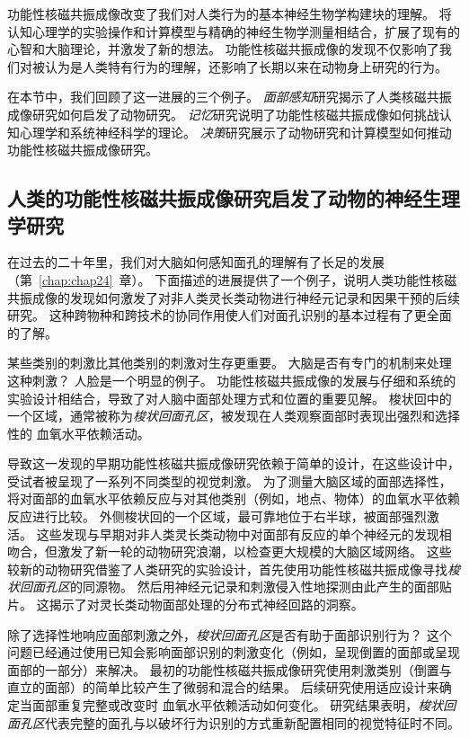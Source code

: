 功能性核磁共振成像改变了我们对人类行为的基本神经生物学构建块的理解。
将认知心理学的实验操作和计算模型与精确的神经生物学测量相结合，扩展了现有的心智和大脑理论，并激发了新的想法。
功能性核磁共振成像的发现不仅影响了我们对被认为是人类特有行为的理解，还影响了长期以来在动物身上研究的行为。


在本节中，我们回顾了这一进展的三个例子。 
\textit{面部感知}研究揭示了人类核磁共振成像研究如何启发了动物研究。
\textit{记忆}研究说明了功能性核磁共振成像如何挑战认知心理学和系统神经科学的理论。
\textit{决策}研究展示了动物研究和计算模型如何推动功能性核磁共振成像研究。


\subsection{人类的功能性核磁共振成像研究启发了动物的神经生理学研究}

在过去的二十年里，我们对大脑如何感知面孔的理解有了长足的发展（第~\ref{chap:chap24}~章）。 
下面描述的进展提供了一个例子，说明人类功能性核磁共振成像的发现如何激发了对非人类灵长类动物进行神经元记录和因果干预的后续研究。
这种跨物种和跨技术的协同作用使人们对面孔识别的基本过程有了更全面的了解。


某些类别的刺激比其他类别的刺激对生存更重要。 
大脑是否有专门的机制来处理这种刺激？ 
人脸是一个明显的例子。 
功能性核磁共振成像的发展与仔细和系统的实验设计相结合，导致了对人脑中面部处理方式和位置的重要见解。 
梭状回中的一个区域，通常被称为\textit{梭状回面孔区}，被发现在人类观察面部时表现出强烈和选择性的 血氧水平依赖活动。


导致这一发现的早期功能性核磁共振成像研究依赖于简单的设计，在这些设计中，受试者被呈现了一系列不同类型的视觉刺激。
为了测量大脑区域的面部选择性，将对面部的血氧水平依赖反应与对其他类别（例如，地点、物体）的血氧水平依赖反应进行比较。 
外侧梭状回的一个区域，最可靠地位于右半球，被面部强烈激活。
这些发现与早期对非人类灵长类动物中对面部有反应的单个神经元的发现相吻合，但激发了新一轮的动物研究浪潮，以检查更大规模的大脑区域网络。
这些较新的动物研究借鉴了人类研究的实验设计，首先使用功能性核磁共振成像寻找\textit{梭状回面孔区}的同源物。
然后用神经元记录和刺激侵入性地探测由此产生的面部贴片。
这揭示了对灵长类动物面部处理的分布式神经回路的洞察。


除了选择性地响应面部刺激之外，\textit{梭状回面孔区}是否有助于面部识别行为？ 
这个问题已经通过使用已知会影响面部识别的刺激变化（例如，呈现倒置的面部或呈现面部的一部分）来解决。 
最初的功能性核磁共振成像研究使用刺激类别（倒置与直立的面部）的简单比较产生了微弱和混合的结果。
后续研究使用适应设计来确定当面部重复完整或改变时 血氧水平依赖活动如何变化。
研究结果表明，\textit{梭状回面孔区}代表完整的面孔与以破坏行为识别的方式重新配置相同的视觉特征时不同。



